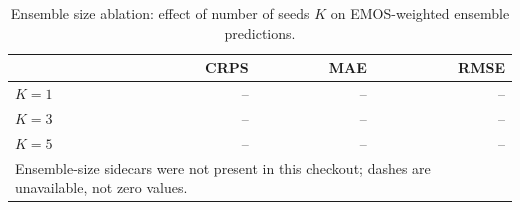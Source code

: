\begin{table}[htbp]
  \centering
  \caption{Ensemble size ablation: effect of number of seeds $K$ on EMOS-weighted ensemble predictions.}
  \label{tab:ensemble}
  \begin{tabular}{l r r r}
    \toprule
     & \textbf{CRPS} & \textbf{MAE} & \textbf{RMSE} \\
    \midrule
    $K = 1$ & -- & -- & -- \\
    $K = 3$ & -- & -- & -- \\
    $K = 5$ & -- & -- & -- \\
    \midrule
    \multicolumn{4}{l}{\footnotesize Ensemble-size sidecars were not present in this checkout; dashes are unavailable, not zero values.} \\
    \bottomrule
  \end{tabular}
\end{table}

